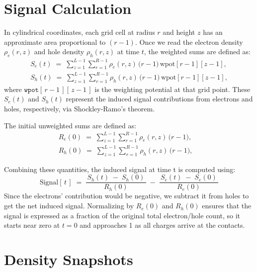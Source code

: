 \section{Signal Calculation}
In cylindrical coordinates, each grid cell at radius $r$ and height $z$ has an approximate area proportional to $(r - 1)$. Once we read the electron 
density $\rho_e(r,z)$ and hole density $\rho_h(r,z)$ at time $t$, the weighted sums are defined as:
\begin{align}
S_e(t) \;=\; \sum_{z=1}^{L-1} \sum_{r=1}^{R-1}
   \rho_e(r,z)\,\bigl(r-1\bigr)\,\text{wpot}[r-1][z-1],\\
S_h(t) \;=\; \sum_{z=1}^{L-1} \sum_{r=1}^{R-1}
   \rho_h(r,z)\,\bigl(r-1\bigr)\,\text{wpot}[r-1][z-1],
\end{align}
where \(\texttt{wpot}[\,r-1\,][\,z-1\,]\) is the weighting potential at that grid 
point. These $S_e(t)$ and $S_h(t)$ represent the induced signal contributions 
from electrons and holes, respectively, via Shockley-Ramo’s theorem.

The initial unweighted sums are defined as:
\begin{align}
R_{e}(0) \;=\; \sum_{z=1}^{L-1} \sum_{r=1}^{R-1}
   \rho_e(r,z)\,\bigl(r-1\bigr), \quad \\
R_{h}(0) \;=\; \sum_{z=1}^{L-1} \sum_{r=1}^{R-1}
   \rho_h(r,z)\,\bigl(r-1\bigr), \quad
\end{align}

Combining these quantities, the induced signal at time t is computed using:
\begin{equation}
\text{Signal}[\,t\,] 
\;=\;
  \frac{\,S_h(t)\;-\;S_h(0)\,}{\,R_{h}(0)\,}
  \;-\;
  \frac{\,S_e(t)\;-\;S_e(0)\,}{\,R_{e}(0)\,}
\label{eq:net-signal}
\end{equation}
Since the electrons’ contribution would be negative, we subtract it from holes to get the net induced signal. Normalizing by $R_{e}(0)$ and $R_{h}(0)$ ensures that the signal is expressed as a fraction of the original total electron/hole count, so it starts near zero at $t=0$ and approaches 1 as all charges arrive at the contacts.

\section{Density Snapshots}

